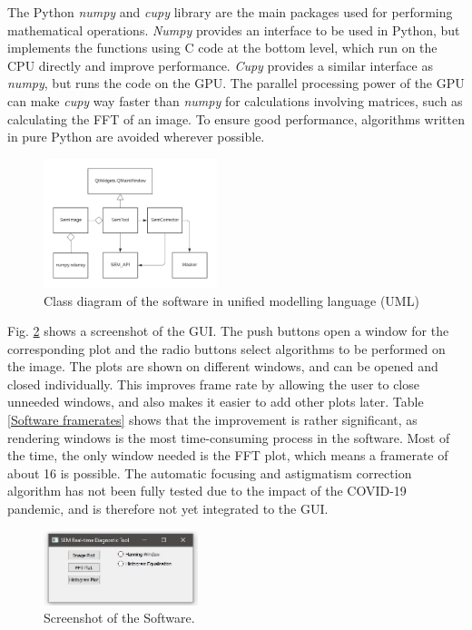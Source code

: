 \documentclass[conference]{IEEEtran}
\begin{document}
The Python \textit{numpy} and \textit{cupy} library are the main packages used for performing mathematical operations. \textit{Numpy} provides an interface to be used in Python, but implements the functions using C code at the bottom level, which run on the CPU directly and improve performance. \textit{Cupy} provides a similar interface as \textit{numpy}, but runs the code on the GPU. The parallel processing power of the GPU can make \textit{cupy} way faster than \textit{numpy} for calculations involving matrices, such as calculating the FFT of an image. To ensure good performance, algorithms written in pure Python are avoided wherever possible.

\begin{figure}[htbp]
    \centering
    \includegraphics[width=0.45\textwidth]{Images/Software classes.png}
    \caption{Class diagram of the software in unified modelling language (UML)}
    \label{Software classes}
\end{figure}

Fig. \ref{Software screenshot} shows a screenshot of the GUI. The push buttons open a window for the corresponding plot and the radio buttons select algorithms to be performed on the image. The plots are shown on different windows, and can be opened and closed individually. This improves frame rate by allowing the user to close unneeded windows, and also makes it easier to add other plots later. Table \ref{Software framerates} shows that the improvement is rather significant, as rendering windows is the most time-consuming process in the software. Most of the time, the only window needed is the FFT plot, which means a framerate of about 16 is possible. The automatic focusing and astigmatism correction algorithm has not been fully tested due to the impact of the COVID-19 pandemic, and is therefore not yet integrated to the GUI.

\begin{figure}[htbp]
    \centering
    \includegraphics[width=0.4\textwidth]{Images/Software screenshot.jpg}
    \caption{Screenshot of the Software.}
    \label{Software screenshot}
\end{figure}
\end{document}
